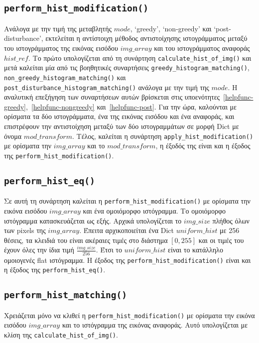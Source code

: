 \documentclass{article}
\begin{document}
\subsection{\texttt{perform\_hist\_modification()}}
Ανάλογα με την τιμή της μεταβλητής $mode$, `greedy', `non-greedy' και
`post-disturbance', εκτελείται η αντίστοιχη μέθοδος αντιστοίχησης ιστογράμματος
μεταξύ του ιστογράμματος της εικόνας εισόδου $img\_array$ και του ιστο\-γράμματος
αναφοράς $hist\_ref$. Το πρώτο υπολογίζεται 
από τη συνάρτηση \verb|calculate_hist_of_img()| και μετά
καλείται μία από τις βοηθητικές συναρτήσεις \verb|greedy_histogram_matching()|, 
\verb|non_greedy_histogram_|\-\verb|matching()| και 
\verb|post_disturbance_histogram_matching()| ανάλογα με την τιμή της 
$mode$. Η αναλυτική επεξήγηση των συναρτήσεων αυτών βρίσκεται στις 
υποενότητες~\ref{helpfunc-greedy},~\ref{helpfunc-nongreedy} και~\ref{helpfunc-post}.
Για την ώρα, καλούνται με ορίσματα τα δύο ιστογράμματα, ένα της εικόνας εισόδου και ένα
αναφοράς, και επιστρέφουν την αντιστοίχηση μεταξύ των δύο ιστογραμμάτων σε 
μορφή Dict με όνομα $mod\_transform$. Τέλος, 
καλείται η συνάρτηση \verb|apply|\-\verb|_hist_modification()| με ορίσματα την $img\_array$
και το $mod\_transform$, η έξοδός της είναι και η έξοδος της 
\verb|perform_hist_modification()|.

\subsection{\texttt{perform\_hist\_eq()}}
Σε αυτή τη συνάρτηση καλείται η \verb|perform_hist_modification()| με ορίσματα 
την εικόνα εισόδου $img\_array$ και ένα ομοιόμορφο ιστόγραμμα. Το ομοιόμορφο 
ιστόγραμμα κατασκευάζεται ως εξής. Αρχικά υπολογίζεται το $img\_size$ πλήθος όλων των pixels 
της $img\_array$. Έπειτα αρχικοποιείται ένα Dict $uniform\_hist$ με 256
θέσεις, τα κλειδιά του είναι ακέραιες τιμές στο διάστημα $\left[0, 255\right]$ και
οι τιμές του έχουν όλες την ίδια τιμή $\frac{img\_size}{256}$. Έτσι το 
$uniform\_hist$ είναι το κατάλληλο ομοιογενές flat ιστόγραμμα. Η έξοδος της 
\verb|perform_hist_modification()| είναι και η έξοδος της \verb|perform_hist_eq()|.

\subsection{\texttt{perform\_hist\_matching()}}
Χρειάζεται μόνο να κλιθεί η \verb|perform_hist_modification()| με ορίσματα την 
εικόνα εισόδου $img\_array$ και το ιστόγραμμα της εικόνας αναφοράς. Αυτό
υπολογίζεται με κλίση της \verb|calculate_hist_of_img()|.
\end{document}
